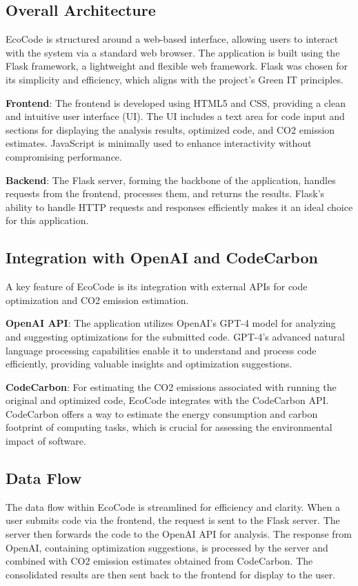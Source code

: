 \documentclass[conference,compsoc]{IEEEtran}
\begin{document}
\subsection{Overall Architecture}
EcoCode is structured around a web-based interface, allowing users to interact with the system via a standard web browser. The application is built using the Flask framework, a lightweight and flexible  web framework. Flask was chosen for its simplicity and efficiency, which aligns with the project's Green IT principles.

\textbf{Frontend}: The frontend is developed using HTML5 and CSS, providing a clean and intuitive user interface (UI). The UI includes a text area for code input and sections for displaying the analysis results, optimized code, and CO2 emission estimates. JavaScript is minimally used to enhance interactivity without compromising performance.

\textbf{Backend}: The Flask server, forming the backbone of the application, handles requests from the frontend, processes them, and returns the results. Flask's ability to handle HTTP requests and responses efficiently makes it an ideal choice for this application.

\subsection{Integration with OpenAI and CodeCarbon}
A key feature of EcoCode is its integration with external APIs for code optimization and CO2 emission estimation.

\textbf{OpenAI API}: The application utilizes OpenAI's GPT-4 model for analyzing and suggesting optimizations for the submitted  code. GPT-4's advanced natural language processing capabilities enable it to understand and process code efficiently, providing valuable insights and optimization suggestions.

\textbf{CodeCarbon}: For estimating the CO2 emissions associated with running the original and optimized code, EcoCode integrates with the CodeCarbon API. CodeCarbon offers a way to estimate the energy consumption and carbon footprint of computing tasks, which is crucial for assessing the environmental impact of software.

\subsection{Data Flow}
The data flow within EcoCode is streamlined for efficiency and clarity. When a user submits  code via the frontend, the request is sent to the Flask server. The server then forwards the code to the OpenAI API for analysis. The response from OpenAI, containing optimization suggestions, is processed by the server and combined with CO2 emission estimates obtained from CodeCarbon. The consolidated results are then sent back to the frontend for display to the user.
\end{document}
